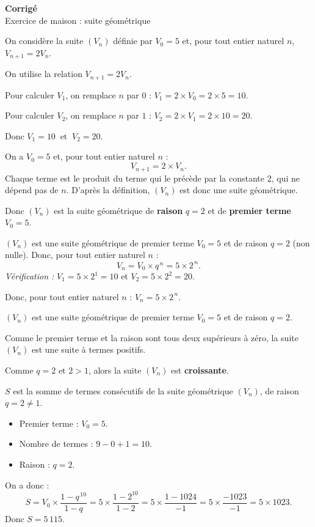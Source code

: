 


\begin{center}
{\LARGE\bfseries Corrigé}\\[4pt]
{\large Exercice de maison : suite géométrique}
\end{center}

On considère la suite $(V_n)$ définie par $V_0 = 5$ et, pour tout entier naturel $n$,
$V_{n+1} = 2V_n$.

On utilise la relation $V_{n+1} = 2V_n$.

Pour calculer $V_1$, on remplace $n$ par $0$ : \quad $V_1 = 2 \times V_0 = 2 \times 5 = 10$.

Pour calculer $V_2$, on remplace $n$ par $1$ : \quad $V_2 = 2 \times V_1 = 2 \times 10 = 20$.

Donc $\boxed{V_1 = 10 \ \text{ et } \ V_2 = 20}$.

On a $V_0 = 5$ et, pour tout entier naturel $n$ :
\[
V_{n+1} = 2 \times V_n.
\]
Chaque terme est le produit du terme qui le précède par la constante $2$, qui ne dépend pas de $n$.
D'après la définition, $(V_n)$ est donc une suite géométrique.

Donc $(V_n)$ est la suite géométrique de \textbf{raison} $\boxed{q = 2}$ et de
\textbf{premier terme} $\boxed{V_0 = 5}$.

$(V_n)$ est une suite géométrique de premier terme $V_0 = 5$ et de raison $q = 2$ (non nulle).
Donc, pour tout entier naturel $n$ :
\[
V_n = V_0 \times q^{\,n} = 5 \times 2^{\,n}.
\]
\emph{Vérification :} $V_1 = 5 \times 2^1 = 10$ et $V_2 = 5 \times 2^2 = 20$.

Donc, pour tout entier naturel $n$ : \quad $\boxed{V_n = 5 \times 2^{\,n}}$.

$(V_n)$ est une suite géométrique de premier terme $V_0 = 5$ et de raison $q = 2$.

Comme le premier terme et la raison sont tous deux supérieurs à zéro, la suite $(V_n)$ est une
suite à termes positifs.

Comme $q = 2$ et $2 > 1$, alors la suite $(V_n)$ est \textbf{croissante}.

$S$ est la somme de termes consécutifs de la suite géométrique $(V_n)$, de raison $q = 2 \neq 1$.
\begin{itemize}
  \item Premier terme : $V_0 = 5$.
  \item Nombre de termes : $9 - 0 + 1 = 10$.
  \item Raison : $q = 2$.
\end{itemize}
On a donc :
\[
S = V_0 \times \frac{1 - q^{\,10}}{1 - q}
  = 5 \times \frac{1 - 2^{10}}{1 - 2}
  = 5 \times \frac{1 - 1024}{-1}
  = 5 \times \frac{-1023}{-1}
  = 5 \times 1023.
\]
Donc $\boxed{S = 5\,115}$.



